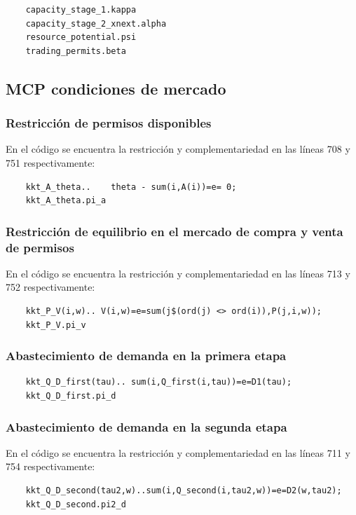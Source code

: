 \begin{verbatim}
    capacity_stage_1.kappa
    capacity_stage_2_xnext.alpha
    resource_potential.psi
    trading_permits.beta
\end{verbatim}

\subsection{MCP condiciones de mercado}

\subsubsection{Restricción de permisos disponibles}
En el código se encuentra la restricción y complementariedad en las líneas 708 y 751 respectivamente: 
\begin{verbatim}
    kkt_A_theta..    theta - sum(i,A(i))=e= 0;
    kkt_A_theta.pi_a
\end{verbatim}

\subsubsection{Restricción de equilibrio en el mercado de compra y venta de permisos}
En el código se encuentra la restricción y complementariedad en las líneas 713 y 752 respectivamente: 
\begin{verbatim}
    kkt_P_V(i,w).. V(i,w)=e=sum(j$(ord(j) <> ord(i)),P(j,i,w));
    kkt_P_V.pi_v 
\end{verbatim}

\subsubsection{Abastecimiento de demanda en la primera etapa}
\begin{verbatim}
    kkt_Q_D_first(tau).. sum(i,Q_first(i,tau))=e=D1(tau);
    kkt_Q_D_first.pi_d
\end{verbatim}

\subsubsection{Abastecimiento de demanda en la segunda etapa}
En el código se encuentra la restricción y complementariedad en las líneas 711 y 754 respectivamente: 
\begin{verbatim}
    kkt_Q_D_second(tau2,w)..sum(i,Q_second(i,tau2,w))=e=D2(w,tau2);
    kkt_Q_D_second.pi2_d
\end{verbatim}